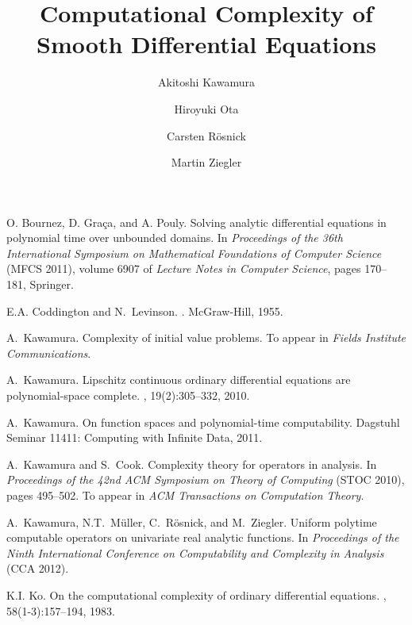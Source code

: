 \documentclass[envcountsame]{llncs}
\title{Computational Complexity of\\Smooth Differential Equations}
\author{%
Akitoshi Kawamura\inst1
\and
Hiroyuki Ota\inst1
\and
Carsten R\"osnick\inst2
\and
Martin Ziegler\inst2
}
\institute{%
University of Tokyo
\and
TU Darmstadt}
\begin{document}
\maketitle








% 
% 

\begin{thebibliography}{10}
O. Bournez, D. Gra{\c c}a, and A. Pouly.
\newblock Solving analytic differential equations in polynomial time over
  unbounded domains.
\newblock In {\em Proceedings of the 36th International Symposium on 
Mathematical Foundations of Computer Science} (MFCS 2011), 
volume 6907 of {\em Lecture Notes in Computer Science}, 
pages 170--181, Springer.

E.A. Coddington and N.~Levinson.
.
\newblock McGraw-Hill, 1955.

A.~Kawamura.
\newblock Complexity of initial value problems.
\newblock To appear in {\em Fields Institute Communications}.

A.~Kawamura.
\newblock Lipschitz continuous ordinary differential equations are
  polynomial-space complete.
, 19(2):305--332, 2010.

A.~Kawamura.
\newblock On function spaces and polynomial-time computability.
\newblock Dagstuhl Seminar 11411: Computing with Infinite Data, 2011.

A.~Kawamura and S.~Cook.
\newblock Complexity theory for operators in analysis.
\newblock In {\em Proceedings of the 42nd ACM Symposium on 
Theory of Computing} (STOC 2010), pages 495--502.
\newblock To appear in {\em ACM Transactions on Computation Theory}.

A.~Kawamura, N.T.~M{\"u}ller, C.~R{\"o}snick, and M.~Ziegler.
\newblock Uniform polytime computable operators on univariate real analytic
  functions.
\newblock In {\em Proceedings of the Ninth International Conference on
  Computability and Complexity in Analysis} (CCA 2012).

K.I. Ko.
\newblock On the computational complexity of ordinary differential equations.
, 58(1-3):157--194, 1983.


\end{thebibliography}
\end{document}
